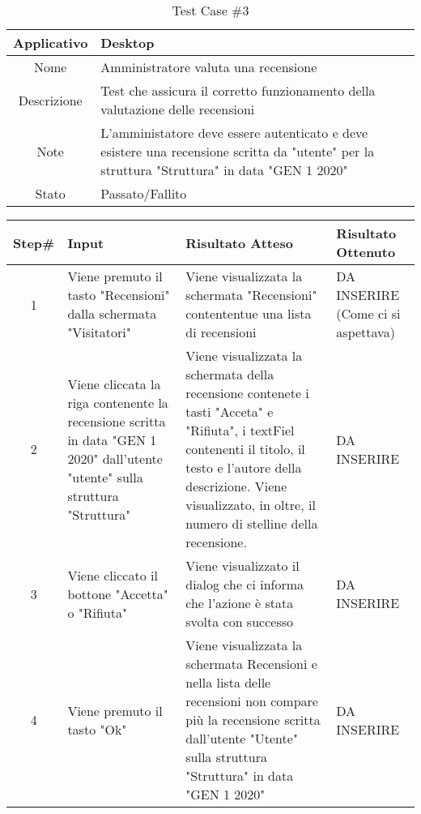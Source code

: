 \pagebreak
\begin{table}[H]
    \centering
    \footnotesize
    \caption{Test Case \#3}
    \begin{tabularx}{\textwidth}{|c|X|}
        \hline
        Applicativo & Desktop\\
        \hline
        Nome & Amministratore valuta una recensione  \\
        \hline
        Descrizione & Test che assicura il corretto funzionamento della valutazione delle recensioni\\
        \hline
        Note & L'amministatore deve essere autenticato e deve esistere una recensione scritta da "utente" per la struttura "Struttura" in data "GEN 1 2020" \\
        \hline
        Stato & Passato/Fallito\\
        \hline

    \end{tabularx}
    \setlength{\tabcolsep}{8pt}
    \renewcommand{\arraystretch}{1.5}
\end{table}

\begin{table}[H]
    \footnotesize
    \begin{tabularx}{\textwidth}{|c|X|X|X|}
        \hline
        Step\# & Input & Risultato Atteso & Risultato Ottenuto \\
        \hline
         1 & Viene premuto il tasto "Recensioni" dalla schermata "Visitatori" 
         & Viene visualizzata la schermata "Recensioni" contententue una lista di recensioni
         &DA INSERIRE (Come ci si aspettava)\\
          \hline
        2 & Viene cliccata la riga contenente la recensione scritta in data "GEN 1 2020" dall'utente "utente" sulla struttura "Struttura"
        & Viene visualizzata la schermata della recensione contenete i tasti "Acceta" e  "Rifiuta", i textFiel contenenti il titolo, il testo e l'autore della descrizione.
        Viene visualizzato, in oltre, il numero di stelline della recensione.
        & DA INSERIRE\\
         \hline 
        3 & Viene cliccato il bottone "Accetta" o "Rifiuta"
         & Viene visualizzato il dialog che ci informa che l'azione è stata svolta con successo
         & DA INSERIRE\\
          \hline
          4 & Viene premuto il tasto "Ok"
         & Viene visualizzata la schermata Recensioni e nella lista delle recensioni non compare più 
         la recensione scritta dall'utente "Utente" sulla struttura "Struttura" in data "GEN 1 2020"
         & DA INSERIRE\\
          \hline      
    \end{tabularx}
\end{table}
    
       
